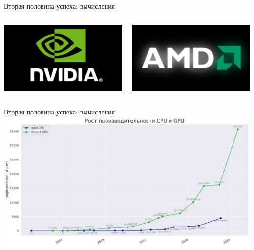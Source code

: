 \documentclass[aspectratio=169]{beamer}
\begin{document}
\begin{frame}{Вторая половина успеха: вычисления}
    \begin{columns}
        \begin{column}{.5\linewidth}
            \centering
            \includegraphics[width=\linewidth]{graphs/fig25_0.jpg}
        \end{column}
        \begin{column}{.5\linewidth}
            \centering
            \includegraphics[width=\linewidth]{graphs/fig25_1.jpg}
        \end{column}
    \end{columns}
\end{frame}

\begin{frame}{Вторая половина успеха: вычисления}
    \centering
    \includegraphics[width=.91\linewidth]{graphs/fig26.jpg}
\end{frame}
\end{document}

